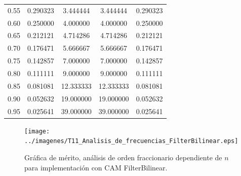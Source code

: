 \documentclass[10pt]{beamer}
\begin{document}
\begin{frame}
\begin{minipage}[b]{0.45\textwidth}
\begin{tiny}
\begin{table}[!hbp]
\begin{tabular}{ccccc}
			0.55 & 0.290323 & 3.444444 & 3.444444 & 0.290323 \\  
			                                             
			0.60 & 0.250000 & 4.000000 & 4.000000 & 0.250000 \\  
			                                              
			0.65 & 0.212121 & 4.714286 & 4.714286 & 0.212121 \\  
			                                             
			0.70 & 0.176471 & 5.666667 & 5.666667 & 0.176471 \\  
			                                              
			0.75 & 0.142857 & 7.000000 & 7.000000 & 0.142857 \\  
			                                              
			0.80 & 0.111111 & 9.000000 & 9.000000 & 0.111111 \\  
			                                             
			0.85 & 0.081081 & 12.333333 & 12.333333 & 0.081081 \\
			                                              
			0.90 & 0.052632 & 19.000000 & 19.000000 & 0.052632 \\
			                                              
			0.95 & 0.025641 & 39.000000 & 39.000000 & 0.025641 \\
			\hline                                              
			\end{tabular}                                                                
	\end{table} 
			\end{tiny}
		\end{minipage} \hfill \begin{minipage}[b]{0.45\textwidth}
			\begin{figure}[hbtp]
		\caption{Gráfica de mérito, análisis de orden fraccionario dependiente de $n$ para implementación con CAM FilterBilinear.} 
		\label{fig:T11_Analisis_de_frecuencias_FilterBilinear}
		\centering
		\texttt{[image: ../imagenes/T11\_Analisis\_de\_frecuencias\_FilterBilinear.eps]}
	\end{figure}
		\end{minipage}
	\end{frame}
\end{document}
